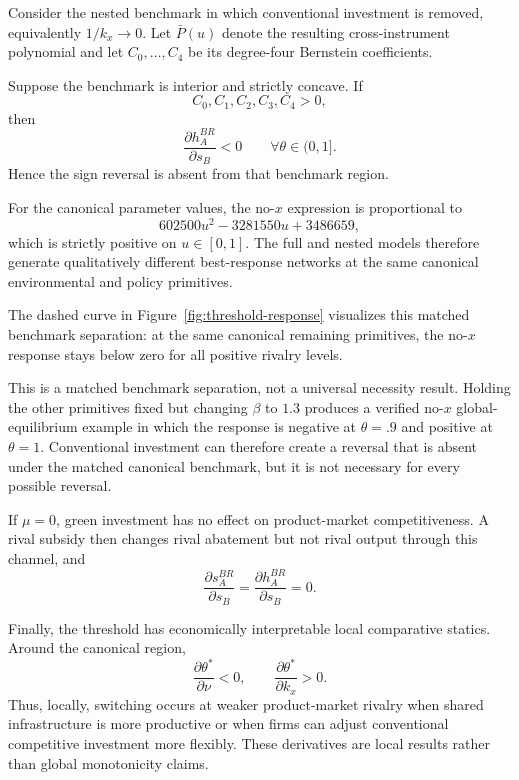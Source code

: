 Consider the nested benchmark in which conventional investment is removed, equivalently $1/k_x\rightarrow0$. Let $\bar P(u)$ denote the resulting cross-instrument polynomial and let $C_0,\ldots,C_4$ be its degree-four Bernstein coefficients.

\begin{proposition}
\label{prop:no-x}
Suppose the benchmark is interior and strictly concave. If
\[
C_0,C_1,C_2,C_3,C_4>0,
\]
then
\[
\frac{\partial h_A^{BR}}{\partial s_B}<0
\qquad\forall\theta\in(0,1].
\]
Hence the sign reversal is absent from that benchmark region.
\end{proposition}

For the canonical parameter values, the no-$x$ expression is proportional to
\begin{equation}
602500u^2-3281550u+3486659,
\label{eq:no-x-witness}
\end{equation}
which is strictly positive on $u\in[0,1]$. The full and nested models therefore generate qualitatively different best-response networks at the same canonical environmental and policy primitives.

The dashed curve in Figure~\ref{fig:threshold-response} visualizes this matched benchmark separation: at the same canonical remaining primitives, the no-$x$ response stays below zero for all positive rivalry levels.

This is a matched benchmark separation, not a universal necessity result. Holding the other primitives fixed but changing $\beta$ to $1.3$ produces a verified no-$x$ global-equilibrium example in which the response is negative at $\theta=.9$ and positive at $\theta=1$. Conventional investment can therefore create a reversal that is absent under the matched canonical benchmark, but it is not necessary for every possible reversal.

\begin{corollary}
\label{cor:mu-zero}
If $\mu=0$, green investment has no effect on product-market competitiveness. A rival subsidy then changes rival abatement but not rival output through this channel, and
\[
\frac{\partial s_A^{BR}}{\partial s_B}
=
\frac{\partial h_A^{BR}}{\partial s_B}=0.
\]
\end{corollary}

Finally, the threshold has economically interpretable local comparative statics. Around the canonical region,
\[
\frac{\partial\theta^*}{\partial\nu}<0,
\qquad
\frac{\partial\theta^*}{\partial k_x}>0.
\]
Thus, locally, switching occurs at weaker product-market rivalry when shared infrastructure is more productive or when firms can adjust conventional competitive investment more flexibly. These derivatives are local results rather than global monotonicity claims.